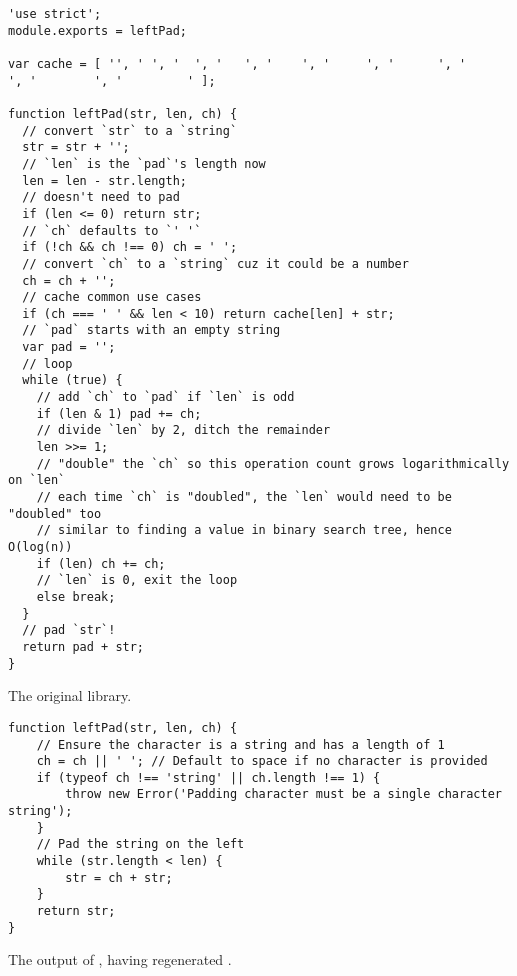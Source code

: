\begin{listing}
\begin{verbatim}
'use strict';
module.exports = leftPad;

var cache = [ '', ' ', '  ', '   ', '    ', '     ', '      ', '       ', '        ', '         ' ];

function leftPad(str, len, ch) {
  // convert `str` to a `string`
  str = str + '';
  // `len` is the `pad`'s length now
  len = len - str.length;
  // doesn't need to pad
  if (len <= 0) return str;
  // `ch` defaults to `' '`
  if (!ch && ch !== 0) ch = ' ';
  // convert `ch` to a `string` cuz it could be a number
  ch = ch + '';
  // cache common use cases
  if (ch === ' ' && len < 10) return cache[len] + str;
  // `pad` starts with an empty string
  var pad = '';
  // loop
  while (true) {
    // add `ch` to `pad` if `len` is odd
    if (len & 1) pad += ch;
    // divide `len` by 2, ditch the remainder
    len >>= 1;
    // "double" the `ch` so this operation count grows logarithmically on `len`
    // each time `ch` is "doubled", the `len` would need to be "doubled" too
    // similar to finding a value in binary search tree, hence O(log(n))
    if (len) ch += ch;
    // `len` is 0, exit the loop
    else break;
  }
  // pad `str`!
  return pad + str;
}
  \end{verbatim}
\caption{The original  library.}
\end{listing}

\begin{listing}
  \begin{verbatim}
function leftPad(str, len, ch) {
    // Ensure the character is a string and has a length of 1
    ch = ch || ' '; // Default to space if no character is provided
    if (typeof ch !== 'string' || ch.length !== 1) {
        throw new Error('Padding character must be a single character string');
    }
    // Pad the string on the left
    while (str.length < len) {
        str = ch + str;
    }
    return str;
}
  \end{verbatim}
  \caption{The output of \sys, having regenerated .}
\end{listing}

